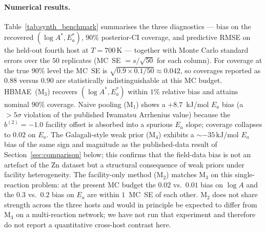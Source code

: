 \documentclass[12pt]{article}
\theoremstyle{plain}
\theoremstyle{definition}
\theoremstyle{remark}
\newcommand{\HBMAE}{HBMAE\xspace}
\begin{document}
\paragraph{Numerical results.}
Table~\ref{tab:synth_benchmark} summarises the three diagnostics --- bias
on the recovered $(\log A^*, E_a^*)$, $90\%$ posterior-CI coverage, and
predictive RMSE on the held-out fourth host at $T=700\,\mathrm{K}$ ---
together with Monte Carlo standard errors over the $50$ replicates
(MC~SE $= s/\sqrt{50}$ for each column).  For coverage at the true
$90\%$ level the MC~SE is $\sqrt{0.9\times 0.1/50}\approx 0.042$, so
coverages reported as $0.88$ versus $0.90$ are statistically
indistinguishable at this MC budget.  \HBMAE\ (M$_3$) recovers
$(\log A^*, E_a^*)$ within $1\%$ relative bias and attains nominal $90\%$
coverage.  Naive pooling (M$_1$) shows a $+8.7$~kJ/mol $E_a$ bias (a
$>5\sigma$ violation of the published Iwamatsu Arrhenius value) because
the $b^{(2)}=-1.0$ facility offset is absorbed into a spurious $E_a$
slope; coverage collapses to $0.02$ on $E_a$.  The Galagali-style weak
prior (M$_4$) exhibits a $\sim -35\,\mathrm{kJ/mol}$ $E_a$ bias of the
same sign and magnitude as the published-data result of
Section~\ref{sec:comparison} below; this confirms that the field-data
bias is not an artefact of the Zn dataset but a structural consequence
of weak priors under facility heterogeneity.  The facility-only method
(M$_2$) matches M$_3$ on this single-reaction problem: at the present
MC budget the $0.02$ vs.\ $0.01$ bias on $\log A$ and the $0.3$ vs.\
$0.2$ bias on $E_a$ are within $1$~MC~SE of each other.  M$_2$ does not
share strength across the three hosts and would in principle be expected
to differ from M$_3$ on a multi-reaction network; we have not run that
experiment and therefore do not report a quantitative cross-host
contrast here.
\end{document}
